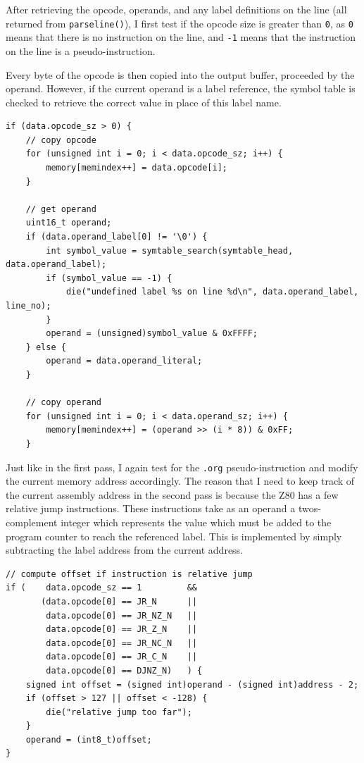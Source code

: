 \documentclass[a4paper]{report}
\begin{document}
After retrieving the opcode, operands, and any label definitions on the line
(all returned from \texttt{parseline()}), I first test if the opcode size is
greater than \texttt{0}, as \texttt{0} means that there is no instruction on the
line, and \texttt{-1} means that the instruction on the line is a
pseudo-instruction.

Every byte of the opcode is then copied into the output buffer, proceeded by the
operand. However, if the current operand is a label reference, the symbol table
is checked to retrieve the correct value in place of this label name.

\begin{lstlisting}
if (data.opcode_sz > 0) {
	// copy opcode
	for (unsigned int i = 0; i < data.opcode_sz; i++) {
		memory[memindex++] = data.opcode[i];
	}

	// get operand
	uint16_t operand;
	if (data.operand_label[0] != '\0') {
		int symbol_value = symtable_search(symtable_head, data.operand_label);
		if (symbol_value == -1) {
			die("undefined label %s on line %d\n", data.operand_label, line_no);
		}
		operand = (unsigned)symbol_value & 0xFFFF;
	} else {
		operand = data.operand_literal;
	}

	// copy operand
	for (unsigned int i = 0; i < data.operand_sz; i++) {
		memory[memindex++] = (operand >> (i * 8)) & 0xFF;
	}
\end{lstlisting}

Just like in the first pass, I again test for the \texttt{.org}
pseudo-instruction and modify the current memory address accordingly. The reason
that I need to keep track of the current assembly address in the second pass is
because the Z80 has a few relative jump instructions. These instructions take as
an operand a twos-complement integer which represents the value which must be
added to the program counter to reach the referenced label. This is implemented
by simply subtracting the label address from the current address.

\begin{lstlisting}
// compute offset if instruction is relative jump
if (	data.opcode_sz == 1			&&
	   (data.opcode[0] == JR_N		||
		data.opcode[0] == JR_NZ_N	||
		data.opcode[0] == JR_Z_N	||
		data.opcode[0] == JR_NC_N	||
		data.opcode[0] == JR_C_N	||
		data.opcode[0] == DJNZ_N)	) {
	signed int offset = (signed int)operand - (signed int)address - 2;
	if (offset > 127 || offset < -128) {
		die("relative jump too far");
	}
	operand = (int8_t)offset;
}
\end{lstlisting}
\end{document}
